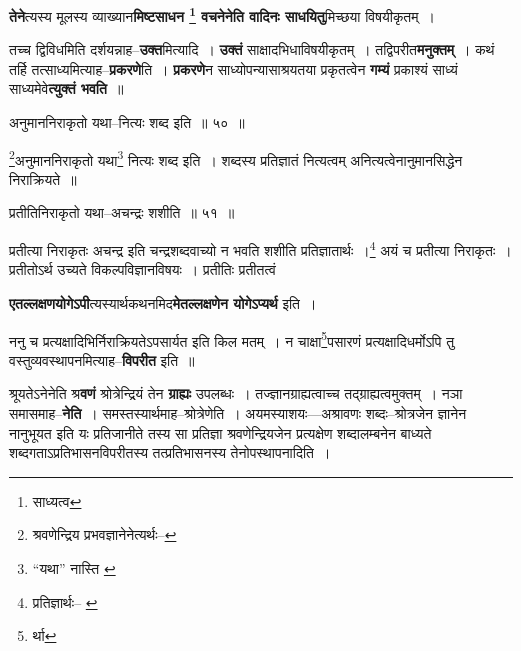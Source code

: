 \documentclass[article,12pt,a4paper]{memoir}
\begin{document}
	  \pstart \textbf{तेने}त्यस्य मूलस्य व्याख्यान\textbf{मिष्टसाधन \footnote{साध्यत्व} वचनेनेति वादिनः साधयितु}मिच्छया विषयीकृतम् ।
	\pend
      

	  \pstart तच्च द्विविधमिति दर्शयन्नाह--\textbf{उक्त}मित्यादि । \textbf{उक्तं} साक्षादभिधाविषयीकृतम् । तद्विपरीत\textbf{मनुक्तम्} । कथं तर्हि तत्साध्यमित्याह--\textbf{प्रकरणे}ति । \textbf{प्रकरणे}न साध्योपन्यासाश्रयतया प्रकृतत्वेन \textbf{गम्यं} प्रकाश्यं साध्यं साध्यमेवे\textbf{त्युक्तं भवति} ॥
	\pend
	  \bigskip
	  \begingroup
	
	  \bigskip
	  \begingroup
	

	  \pstart अनुमाननिराकृतो यथा--नित्यः शब्द इति ॥ ५० ॥
	\pend
      
	  \endgroup
	 

	  \pstart \footnote{श्रवणेन्द्रिय प्रभवज्ञानेनेत्यर्थः--\cite{dp-msD-n}}\-अनुमाननिराकृतो यथा\footnote{“यथा” नास्ति \cite{dp-msC} \cite{dp-msD} \cite{dp-edH} \cite{dp-edE} \cite{dp-edN}} नित्यः शब्द इति । शब्दस्य प्रतिज्ञातं नित्यत्वम् अनित्यत्वेनानुमानसिद्धेन निराक्रियते ॥
	\pend
       
	  \bigskip
	  \begingroup
	

	  \pstart प्रतीतिनिराकृतो यथा--अचन्द्रः शशीति ॥ ५१ ॥
	\pend
      
	  \endgroup
	 

	  \pstart प्रतीत्या निराकृतः अचन्द्र इति चन्द्रशब्दवाच्यो न भवति शशीति प्रतिज्ञातार्थः ।\footnote{प्रतिज्ञार्थः--\cite{dp-msC} \cite{dp-msD}} अयं च प्रतीत्या निराकृतः । प्रतीतोऽर्थ उच्यते विकल्पविज्ञानविषयः । प्रतीतिः प्रतीतत्वं
	\pend
      
	  \endgroup
	

	  \pstart \textbf{एतल्लक्षणयोगेऽपी}त्यस्यार्थकथनमिद\textbf{मेतल्लक्षणेन योगेऽप्यर्थ} इति ।
	\pend
      

	  \pstart ननु च प्रत्यक्षादिभिर्निराक्रियतेऽपसार्यत इति किल मतम् । न चाक्षा\footnote{र्था}\-पसारणं प्रत्यक्षादिधर्मोऽपि तु वस्तुव्यवस्थापनमित्याह--\textbf{विपरीत} इति ॥
	\pend
      

	  \pstart श्रूयतेऽनेनेति श्र\textbf{वणं} श्रोत्रेन्द्रियं तेन \textbf{ग्राह्यः} उपलब्धः । तज्ज्ञानग्राह्यत्वाच्च तद्ग्राह्यत्वमुक्तम् । नञा समासमाह--\textbf{नेति} । समस्तस्यार्थमाह--श्रोत्रेणेति । अयमस्याशयः—अश्रावणः शब्दः--श्रोत्रजे\leavevmode{}न ज्ञानेन नानुभूयत इति यः प्रतिजानीते तस्य सा प्रतिज्ञा श्रवणेन्द्रियजेन प्रत्यक्षेण शब्दालम्बनेन बाध्यते शब्दगताऽप्रतिभासनविपरीतस्य तत्प्रतिभासनस्य तेनोपस्थापनादिति ।
	\pend
      
\end{document}

